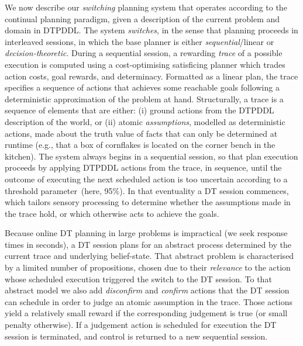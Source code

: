 
We now describe our {\em switching} planning system that operates
according to the continual planning paradigm, given a description of
the current problem and domain in DTPDDL. The system {\em
switches}, in the sense that planning proceeds in interleaved
sessions, in which the base planner is either {\em sequential}/linear
or {\em decision-theoretic}.
During a sequential session, a rewarding {\em trace} of a possible
execution is computed using a cost-optimising satisficing planner
which trades action costs, goal rewards, and determinacy.
Formatted as a linear plan, the trace specifies a sequence of actions
that achieves some reachable goals following a deterministic
approximation of the problem at hand.
Structurally, a trace is a sequence of elements that are either: (i) ground
actions from the DTPDDL description of the world, or (ii) atomic {\em
assumptions}, modelled as deterministic actions, made about the truth
value of facts that can only be determined at runtime (e.g., that a
box of cornflakes is located on the corner bench in the kitchen).
The system always begins in a sequential session, so that plan
execution proceeds by applying DTPDDL actions from the trace, in
sequence, until the outcome of executing the next scheduled action is
too uncertain according to a threshold parameter~(here, 95\%). In that
eventuality a DT session commences, which tailors sensory processing
to determine whether the assumptions made in the trace hold, or which
otherwise acts to achieve the goals.


Because online DT planning in large problems is impractical (we seek
response times in seconds), a DT session plans for an abstract process
determined by the current trace and underlying belief-state. That
abstract problem is characterised by a limited number of propositions,
chosen due to their {\em relevance} to the action whose scheduled
execution triggered the switch to the DT session.
To that abstract model we also add {\em disconfirm} and {\em confirm}
actions that the DT session can schedule in order to judge an atomic
assumption in the trace. Those actions yield a relatively small reward
if the corresponding judgement is true (or small penalty
otherwise). If a judgement action is scheduled for execution the DT
session is terminated, and control is returned to a new sequential
session.

